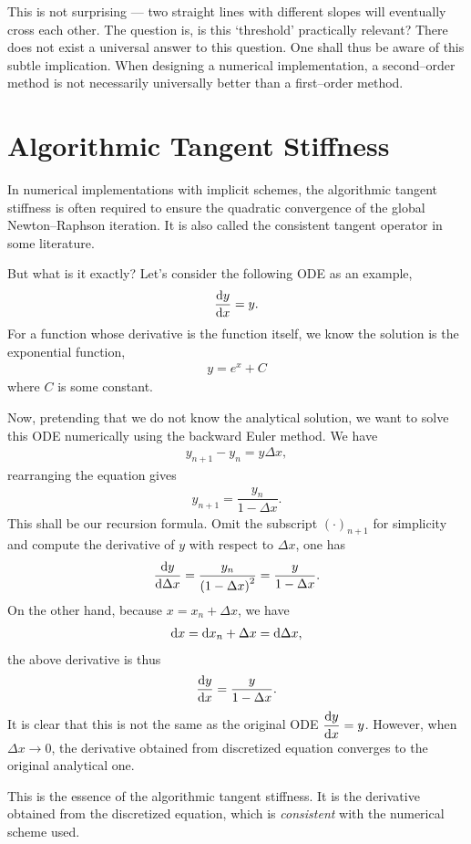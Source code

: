 This is not surprising --- two straight lines with different slopes will eventually cross each other.
The question is, is this `threshold' practically relevant?
There does not exist a universal answer to this question.
One shall thus be aware of this subtle implication.
When designing a numerical implementation, a second--order method is not necessarily universally better than a first--order method.
\section{Algorithmic Tangent Stiffness}
In numerical implementations with implicit schemes, the algorithmic tangent stiffness is often required to ensure the quadratic convergence of the global Newton--Raphson iteration.
It is also called the consistent tangent operator in some literature.

But what is it exactly?
Let's consider the following ODE as an example,
\begin{gather}
    \dfrac{\mathrm{d}y}{\mathrm{d}x}=y.
\end{gather}
For a function whose derivative is the function itself, we know the solution is the exponential function,
\begin{gather}
    y=e^x+C
\end{gather}
where $C$ is some constant.

Now, pretending that we do not know the analytical solution, we want to solve this ODE numerically using the backward Euler method.
We have
\begin{gather}
    y_{n+1}-y_n=y\Delta{}x,
\end{gather}
rearranging the equation gives
\begin{gather}
    y_{n+1}=\dfrac{y_n}{1-\Delta{}x}.
\end{gather}
This shall be our recursion formula.
Omit the subscript $\left(\cdot\right)_{n+1}$ for simplicity and compute the derivative of $y$ with respect to $\Delta{}x$, one has
\begin{gather}
    \dfrac{\mathrm{d}y}{\mathrm{d}\Delta{}x}=\dfrac{y_n}{\left(1-\Delta{}x\right)^2}=\dfrac{y}{1-\Delta{}x}.
\end{gather}
On the other hand, because $x=x_n+\Delta{}x$, we have
\begin{gather}
    \mathrm{d}x=\mathrm{d}x_n+\Delta{}x=\mathrm{d}\Delta{}x,
\end{gather}
the above derivative is thus
\begin{gather}
    \dfrac{\mathrm{d}y}{\mathrm{d}x}=\dfrac{y}{1-\Delta{}x}.
\end{gather}
It is clear that this is not the same as the original ODE $\dfrac{\mathrm{d}y}{\mathrm{d}x}=y$.
However, when $\Delta{}x\to0$, the derivative obtained from discretized equation converges to the original analytical one.

This is the essence of the algorithmic tangent stiffness.
It is the derivative obtained from the discretized equation, which is \textit{consistent} with the numerical scheme used.
